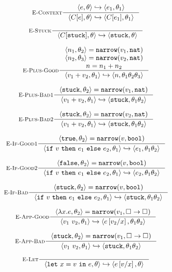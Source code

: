 \begin{figure}
$$
\inference[\recontext]
  {\step{e}{\su}{e_1}{\su_1}}
  {\step{C[e]}{\su}{C[e_1]}{\su_1}}
$$

$$
\inference[\restuck]
  {}
  {\step{C[\stuck]}{\su}{\stuck}{\su}}
$$

$$
\inference[\replusgood]
  {\pair{n_1}{\su_2} = \force{v_1}{\tnat} \\
   \pair{n_2}{\su_3} = \force{v_2}{\tnat} \\ 
   n = \eplus{n_1}{n_2}}
  {\step{\eplus{v_1}{v_2}}{\su_1}{n}{\su_1\su_2\su_3}}
$$

$$
\inference[\replusbadone]
  {\pair{\stuck}{\su_2} = \force{v_1}{\tnat}}
  {\step{\eplus{v_1}{v_2}}{\su_1}{\stuck}{\su_1\su_2}}
$$

$$
\inference[\replusbadtwo]
  {\pair{\stuck}{\su_2} = \force{v_2}{\tnat}}
  {\step{\eplus{v_1}{v_2}}{\su_1}{\stuck}{\su_1\su_2}}
$$

$$
\inference[\reifgoodone]
  {\pair{\etrue}{\su_2} = \force{v}{\tbool}}
  {\step{\eif{v}{e_1}{e_2}}{\su_1}{e_1}{\su_1\su_2}}
$$

$$
\inference[\reifgoodtwo]
  {\pair{\efalse}{\su_2} = \force{v}{\tbool}}
  {\step{\eif{v}{e_1}{e_2}}{\su_1}{e_2}{\su_1\su_2}}
$$

$$
\inference[\reifbad]
  {\pair{\stuck}{\su_2} = \force{v}{\tbool}}
  {\step{\eif{v}{e_1}{e_2}}{\su_1}{\stuck}{\su_1\su_2}}
$$

$$
\inference[\reappgood]
  {\pair{\efun{x}{e}}{\su_2} = \force{v_1}{\tfun{\thole{}}{\thole{}}}}
  {\step{\eapp{v_1}{v_2}}{\su_1}{e\sub{x}{v_2}}{\su_1\su_2}}
$$

$$
\inference[\reappbad]
  {\pair{\stuck}{\su_2} = \force{v_1}{\tfun{\thole{}}{\thole{}}}}
  {\step{\eapp{v_1}{v_2}}{\su_1}{\stuck}{\su_1\su_2}}
$$

$$
\inference[\relet]
  {}
  {\step{\elet{x}{v}{e}}{\su}{e\sub{x}{v}}{\su}}
$$
\\ [0.1in]



\end{figure}

